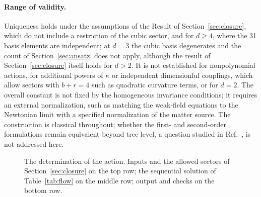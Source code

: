\documentclass[prd,aps,preprint,nofootinbib,amsmath,amssymb,eqsecnum]{revtex4-2}
\newcommand{\W}{\mathcal{W}}
\begin{document}
\paragraph*{Range of validity.} Uniqueness holds under the assumptions of the Result of
Section~\ref{sec:closure}, which do not include a restriction of the cubic sector, and
for $d\geq4$, where the 31 basis elements are independent; at $d=3$ the cubic basis
degenerates and the count of Section~\ref{sec:ansatz} does not apply, although the
result of Section~\ref{sec:closure} itself holds for $d>2$. It is not established for nonpolynomial actions, for additional powers of $\kappa$ or independent
dimensionful couplings, which allow sectors with $b+r=4$ such as quadratic curvature terms,
or for $d=2$. The overall
constant is not fixed by the homogeneous invariance conditions; it requires an external
normalization, such as matching the weak-field equations to the Newtonian limit with a
specified normalization of the matter source. The construction is classical throughout;
whether the first- and second-order formulations remain equivalent beyond tree level, a
question studied in Ref.~\cite{BrandtMcKeon2016}, is not addressed here.

\begin{figure}[htb]
\centering
{}
\caption{The determination of the action. Inputs and the allowed sectors of
Section~\ref{sec:closure} on the top row; the sequential solution of
Table~\ref{tab:flow} on the middle row; output and checks on the bottom row.}
\label{fig:flow}
\end{figure}
\end{document}
